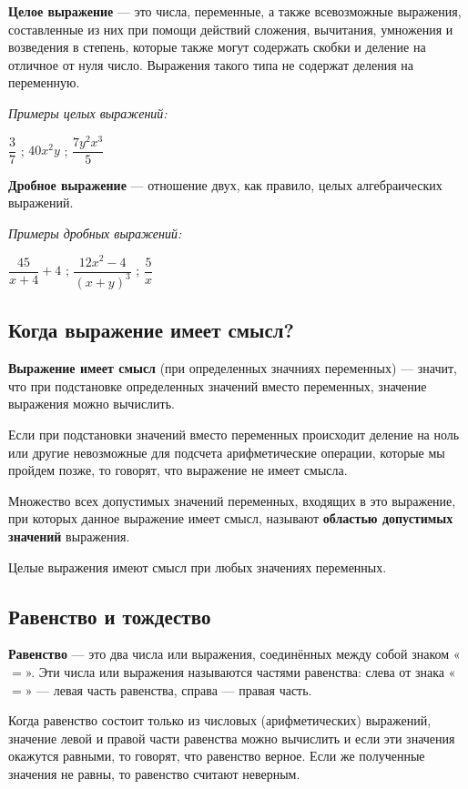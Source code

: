 \documentclass[12pt, a4paper]{article}
\begin{document}
	\textbf{Целое выражение} — это числа, переменные, а также всевозможные выражения, составленные из них при помощи действий сложения, вычитания, умножения и возведения в степень, которые также могут содержать скобки и деление на отличное от нуля число. Выражения такого типа не содержат деления на переменную.
	
	\textit{Примеры целых выражений:}
	\begin{center}
		$\dfrac{3}{7}$ ; $40x^2y$ ; $\dfrac{7y^2x^3}{5}$
	\end{center}

	\textbf{Дробное выражение} — отношение двух, как правило, целых алгебраических выражений.
	
	\textit{Примеры дробных выражений:}
	\begin{center}
		$\dfrac{45}{x+4}+4$ ; $\dfrac{12x^2-4}{(x+y)^3}$ ; $\dfrac{5}{x}$
	\end{center}
	
	\subsection*{Когда выражение имеет смысл?}
	
	\textbf{Выражение имеет смысл} (при определенных значниях переменных) — значит, что при подстановке определенных значений вместо переменных, значение выражения можно вычислить.
	
	Если при подстановки значений вместо переменных происходит деление на ноль или другие невозможные для подсчета арифметические операции, которые мы пройдем позже, то говорят, что выражение не имеет смысла.
	
	Множество всех допустимых значений переменных, входящих в это выражение, при которых данное выражение имеет смысл, называют \textbf{областью допустимых значений} выражения.
	
	Целые выражения имеют смысл при любых значениях переменных.
	
	\subsection*{Равенство и тождество}
	
	\textbf{Равенство} — это два числа или выражения, соединённых между собой знаком «$=$». Эти числа или выражения называются частями равенства: слева от знака «$=$» — левая часть равенства, справа — правая часть.
	
	Когда равенство состоит только из числовых (арифметических) выражений, значение левой и правой части равенства можно вычислить и если эти значения окажутся равными, то говорят, что равенство верное. Если же полученные значения не равны, то равенство считают неверным.
	
\end{document}
